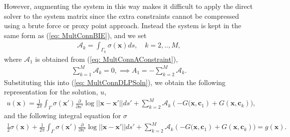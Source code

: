 \documentclass{sfuthesis}
\begin{document}
However, augmenting the system in this way makes it difficult to apply the direct solver to the system matrix since the extra constraints cannot be compressed using a brute force or proxy point approach. Instead the system is kept in the same form as (\ref{eq: MultConnBIE}), and we set 
\begin{align*}
	\mathcal{A}_k=\int_{\Gamma_k} \sigma(\mathbf{x}) ds, \quad k=2,.., M, 
\end{align*}
where $\mathcal{A}_1$ is obtained from (\ref{eq: MultConnAConstraint}), 
\begin{align*}
	\sum_{k=1}^M \mathcal{A}_k=0, \implies A_1=-\sum_{k=2}^M \mathcal{A}_k.
\end{align*}
Substituting this into (\ref{eq: MultConnDLPSoln}), we obtain the following representation for the solution, $u$,  
\begin{align*}
	u(\mathbf{x})=\frac{1}{2\pi} \int_\Gamma \sigma(\mathbf{x}') \frac{\partial}{\partial n'} \log {||\mathbf{x}-\mathbf{x}'||}ds' + \sum_{k=2}^M \mathcal{A}_k \left(-G(\mathbf{x}, \mathbf{c}_1\right)+G(\mathbf{x}, \mathbf{c}_k)),
\end{align*}
and the following integral equation for $\sigma$
\begin{align}
	\frac{1}{2}\sigma(\mathbf{x})+\frac{1}{2\pi} \int_{\Gamma} \sigma(\mathbf{x}') \frac{\partial}{\partial n'} \log {||\mathbf{x}-\mathbf{x}'||} ds' + \sum_{k=2}^M \mathcal{A}_k \left(-G(\mathbf{x}, \mathbf{c}_1\right)+G(\mathbf{x}, \mathbf{c}_k))=g(\mathbf{x}). \label{eq: MultConnBIEFDS} 
\end{align}

\end{document}
